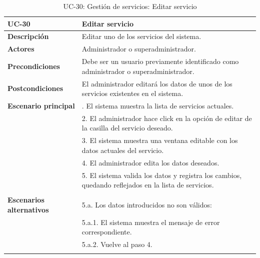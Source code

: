 \begin{table}
  \begin{center}
    \begin{tabularx}{16.4cm}{|l|X|}
      \hline
      \textbf{UC-30} & \textbf{Editar servicio}\\
      \hline
      \textbf{Descripción} & Editar uno de los servicios del sistema.\\
      \hline
      \textbf{Actores} & Administrador o superadministrador.\\
      \hline
      \textbf{Precondiciones} & Debe ser un usuario previamente identificado como administrador o superadministrador.\\
      \hline
      \textbf{Postcondiciones} & El administrador editará los datos de unos de los servicios existentes en el sistema.\\
      \hline
      \textbf{Escenario principal} & \smallskip 1. El sistema muestra la lista de servicios actuales.\\
      & 2. El administrador hace click en la opción de editar de la casilla del servicio deseado.\\
      & 3. El sistema muestra una ventana editable con los datos actuales del servicio.\\
      & 4. El administrador edita los datos deseados.\\
      & 5. El sistema valida los datos y registra los cambios, quedando reflejados en la lista de servicios.\\
      & \\
      \hline
      \textbf{Escenarios alternativos} & \smallskip 5.a. Los datos introducidos no son válidos:\\
      & \hspace{0.3cm} 5.a.1. El sistema muestra el mensaje de error correspondiente.\\
      & \hspace{0.3cm} 5.a.2. Vuelve al paso 4.\\
      & \\
      \hline
    \end{tabularx}
    \caption{UC-30: Gestión de servicios: Editar servicio}
    \label{tab:CU-editar-servicio}
  \end{center}
\end{table}


